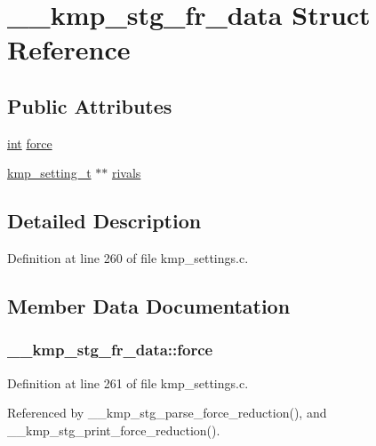 \hypertarget{struct____kmp__stg__fr__data}{\section{\-\_\-\-\_\-kmp\-\_\-stg\-\_\-fr\-\_\-data Struct Reference}
\label{struct____kmp__stg__fr__data}
}
\subsection*{Public Attributes}
\begin{DoxyCompactItemize}
\item 
\hyperlink{ittnotify__static_8h_a8b8dcd723308a8cb5d84277c7a3fff70}{int} \hyperlink{struct____kmp__stg__fr__data_a3c604d6fd09507b775cc314920b065a6}{force}
\item 
\hyperlink{kmp__settings_8c_a77bbb2b0026d9ec5b857e91c44872932}{kmp\-\_\-setting\-\_\-t} $\ast$$\ast$ \hyperlink{struct____kmp__stg__fr__data_a9cfa9921249c7d27a7b887f0bc8e8633}{rivals}
\end{DoxyCompactItemize}


\subsection{Detailed Description}


Definition at line 260 of file kmp\-\_\-settings.\-c.



\subsection{Member Data Documentation}
\hypertarget{struct____kmp__stg__fr__data_a3c604d6fd09507b775cc314920b065a6}{
\subsubsection[{force}]{ \-\_\-\-\_\-kmp\-\_\-stg\-\_\-fr\-\_\-data\-::force}}\label{struct____kmp__stg__fr__data_a3c604d6fd09507b775cc314920b065a6}


Definition at line 261 of file kmp\-\_\-settings.\-c.



Referenced by \-\_\-\-\_\-kmp\-\_\-stg\-\_\-parse\-\_\-force\-\_\-reduction(), and \-\_\-\-\_\-kmp\-\_\-stg\-\_\-print\-\_\-force\-\_\-reduction().

